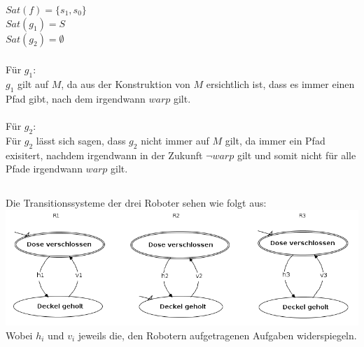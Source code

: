 \documentclass[a4paper,12pt]{scrartcl}
\begin{document}
\subsubsection{}
$Sat(f)= \{s_1, s_0\}$\\
$Sat(g_1)= S$\\
$Sat(g_2)= \emptyset$
\subsubsection{}
Für $g_1$:\\
$g_1$ gilt auf $M$, da aus der Konstruktion von $M$ ersichtlich ist, 
dass es immer einen Pfad gibt, nach dem irgendwann $warp$ gilt.\\\\
Für $g_2$:\\
Für $g_2$ lässt sich sagen, dass $g_2$ nicht immer auf $M$ gilt, da immer ein Pfad exisitert, nachdem irgendwann in der Zukunft $\neg warp$ gilt und somit nicht für alle Pfade irgendwann $warp$ gilt.

\subsection{}
\subsubsection{}
Die Transitionssysteme der drei Roboter sehen wie folgt aus:\\
\includegraphics[scale=0.5]{roboter_trans.png}\\
Wobei $h_i$ und $v_i$ jeweils die, den Robotern aufgetragenen Aufgaben widerspiegeln.
\end{document}
